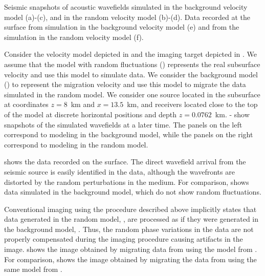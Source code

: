 

{Seismic snapshots of acoustic wavefields simulated in the background
velocity model (a)-(c), and in the random velocity model (b)-(d).
Data recorded at the surface from simulation in the background
velocity model (e) and from the simulation in the random velocity
model (f).}

Consider the velocity model depicted in  and the
imaging target depicted in . We assume that the model
with random fluctuations () represents the real
subsurface velocity and use this model to simulate data. We consider
the background model () to represent the migration
velocity and use this model to migrate the data simulated in the
random model. We consider one source located in the subsurface at
coordinates $z=8$~km and $x=13.5$~km, and receivers located close to
the top of the model at discrete horizontal positions and depth
$z=0.0762$~km. - show snapshots of
the simulated wavefields at a later time. The panels on the left
correspond to modeling in the background model, while the panels on
the right correspond to modeling in the random model.

 shows the data recorded on the surface. The direct
wavefield arrival from the seismic source is easily identified in the
data, although the wavefronts are distorted by the random
perturbations in the medium. For comparison,  shows
data simulated in the background model, which do not show random
fluctuations.

Conventional imaging using the procedure described above implicitly
states that data generated in the random model, ,
are processed as if they were generated in the background model,
. Thus, the random phase variations in the data are
not properly compensated during the imaging procedure causing
artifacts in the image.  shows the image obtained
by migrating data from  using the model from
. For comparison,  shows the image 
obtained by migrating the data from  using the same
model from .

